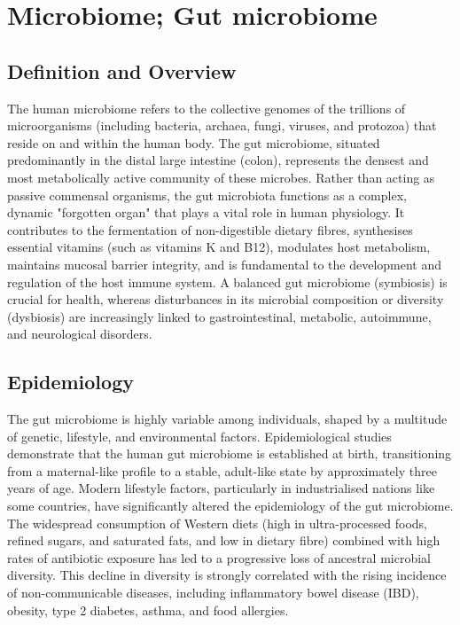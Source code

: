 \chapter{Microbiome; Gut microbiome}

\section*{Definition and Overview}
The human microbiome refers to the collective genomes of the trillions of microorganisms (including bacteria, archaea, fungi, viruses, and protozoa) that reside on and within the human body. The gut microbiome, situated predominantly in the distal large intestine (colon), represents the densest and most metabolically active community of these microbes. Rather than acting as passive commensal organisms, the gut microbiota functions as a complex, dynamic "forgotten organ" that plays a vital role in human physiology. It contributes to the fermentation of non-digestible dietary fibres, synthesises essential vitamins (such as vitamins K and B12), modulates host metabolism, maintains mucosal barrier integrity, and is fundamental to the development and regulation of the host immune system. A balanced gut microbiome (symbiosis) is crucial for health, whereas disturbances in its microbial composition or diversity (dysbiosis) are increasingly linked to gastrointestinal, metabolic, autoimmune, and neurological disorders.

\section*{Epidemiology}
The gut microbiome is highly variable among individuals, shaped by a multitude of genetic, lifestyle, and environmental factors. Epidemiological studies demonstrate that the human gut microbiome is established at birth, transitioning from a maternal-like profile to a stable, adult-like state by approximately three years of age. Modern lifestyle factors, particularly in industrialised nations like some countries, have significantly altered the epidemiology of the gut microbiome. The widespread consumption of Western diets (high in ultra-processed foods, refined sugars, and saturated fats, and low in dietary fibre) combined with high rates of antibiotic exposure has led to a progressive loss of ancestral microbial diversity. This decline in diversity is strongly correlated with the rising incidence of non-communicable diseases, including inflammatory bowel disease (IBD), obesity, type 2 diabetes, asthma, and food allergies.


